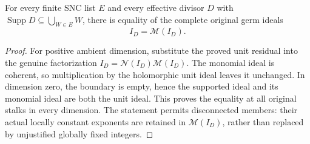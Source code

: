 \begin{theorem}
\label{hir:intrinsic-supported-ideal-monomial}
\leanok
For every finite SNC list $E$ and every effective divisor $D$ with
$\operatorname{Supp}D\subseteq\bigcup_{W\in E}W$, there is equality of
the complete original germ ideals
\[
 I_D=\mathcal M(I_D).
\]
\end{theorem}
\begin{proof}
For positive ambient dimension, substitute the proved unit residual
into the genuine factorization
$I_D=\mathcal N(I_D)\mathcal M(I_D)$.
The monomial ideal is coherent, so multiplication by the holomorphic
unit ideal leaves it unchanged.  In dimension zero, the boundary is
empty, hence the supported ideal and its monomial ideal are both the
unit ideal.  This proves the equality at all original stalks in every
dimension.  The statement permits disconnected members: their actual
locally constant exponents are retained in $\mathcal M(I_D)$, rather
than replaced by unjustified globally fixed integers.
\end{proof}
